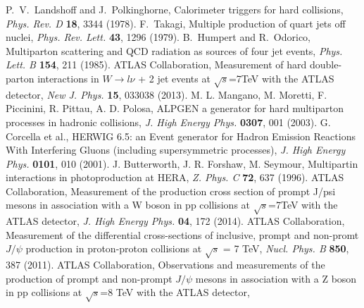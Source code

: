 \documentclass{ws-rv9x6}
\begin{document}





\begin{thebibliography}{99}
   P.~V.~Landshoff and J.~Polkinghorne, Calorimeter triggers for hard collisions, \emph{Phys. Rev. D} {\bf 18}, 3344 (1978).
   F.~Takagi, Multiple production of quart jets off nuclei, \emph{Phys. Rev. Lett.} {\bf 43}, 1296 (1979).
   B.~Humpert and R.~Odorico, Multiparton scattering and QCD radiation as sources of four jet events, \emph{Phys. Lett. B} {\bf 154}, 211 (1985).
   ATLAS Collaboration, Measurement of hard double-parton interactions in $W\rightarrow l\nu$ + 2 jet events at $\sqrt{s}$=7TeV with the ATLAS detector,
   \emph{New J. Phys.} {\bf 15}, 033038 (2013).
    M. L. Mangano, M. Moretti, F. Piccinini, R. Pittau, A. D. Polosa, ALPGEN a generator for hard multiparton processes in hadronic collisions, \emph{J. High Energy Phys.} {\bf 0307}, 001 (2003).
G. Corcella et al., HERWIG 6.5: an Event generator for Hadron Emission Reactions With Interfering Gluons (including supersymmetric processes), \emph{J. High Energy Phys.} {\bf 0101}, 010 (2001).
J. Butterworth, J. R. Forshaw, M. Seymour, Multipartin interactions in photoproduction at HERA, \emph{Z. Phys. C} {\bf 72}, 637 (1996).
   ATLAS Collaboration, Measurement of the production cross section of prompt J/psi mesons in association with a W boson in pp collisions at $\sqrt{s}$=7TeV with the ATLAS detector,
    \emph{J. High Energy Phys.} {\bf 04}, 172 (2014).
ATLAS Collaboration, Measurement of the differential cross-sections of inclusive, prompt and non-promt $J/\psi$ production in proton-proton collisions at $\sqrt{s}$ = 7 TeV, \emph{Nucl. Phys. B} {\bf 850}, 387 (2011). 
   ATLAS Collaboration, Observations and measurements of the production of prompt and non-prompt $J/\psi$ mesons in association with a Z boson in pp collisions at $\sqrt{s}$=8 TeV with the ATLAS detector,

\end{thebibliography}
\end{document}
